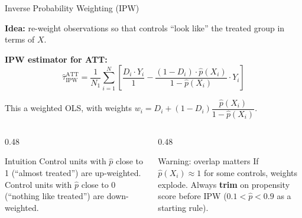 \documentclass[aspectratio=169, 10pt]{beamer}
\begin{document}

\begin{frame}{Inverse Probability Weighting (IPW)}

  \textbf{Idea:} re-weight observations so that controls ``look like'' the treated group in terms of $X$.

  \medskip
  \textbf{IPW estimator for ATT:}
  \[
    \widehat{\tau}^{\text{ATT}}_{\text{IPW}} =
      \frac{1}{N_1} \sum_{i=1}^N \left[
        \frac{D_i \cdot Y_i}{1} -
        \frac{(1-D_i) \cdot \hat{p}(X_i)}{1-\hat{p}(X_i)} \cdot Y_i
      \right]
  \]

  This a weighted OLS, with weights
  $w_i = D_i + (1-D_i)\dfrac{\hat{p}(X_i)}{1-\hat{p}(X_i)}$.

  \bigskip
  \begin{columns}[T]
    \begin{column}{0.48\textwidth}
      \begin{exampleblock}{Intuition}
        Control units with $\hat{p}$ close to 1 (``almost treated'') are up-weighted. Control units with $\hat{p}$ close to 0 (``nothing like treated'') are down-weighted.
      \end{exampleblock}
    \end{column}
    \begin{column}{0.48\textwidth}
      \begin{alertblock}{Warning: overlap matters}
        If $\hat{p}(X_i) \approx 1$ for some controls, weights explode. Always \textbf{trim} on propensity score before IPW ($0.1 < \hat{p} < 0.9$ as a starting rule).
      \end{alertblock}
    \end{column}
  \end{columns}
\end{frame}

\end{document}
